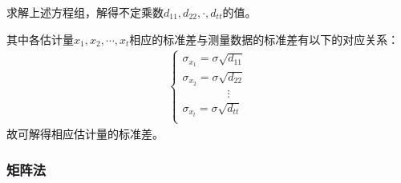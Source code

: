 \documentclass{ctexart}
\begin{document}
				求解上述方程组，解得不定乘数$d_{11},d_{22},\cdot,d_{tt}$的值。\par
				其中各估计量$x_1,x_2,\cdots,x_t$相应的标准差与测量数据的标准差有以下的对应关系：
				\begin{gather}
					\begin{cases}
						\sigma_{x_1}=\sigma\sqrt{d_{11}}\\
						\sigma_{x_2}=\sigma\sqrt{d_{22}}\\
						\qquad\qquad\vdots\\
						\sigma_{x_t}=\sigma\sqrt{d_{tt}}\\
					\end{cases}
					\label{con:估计量标准差公式}
				\end{gather}
				故可解得相应估计量的标准差。
			\subsubsection{矩阵法}
\end{document}
